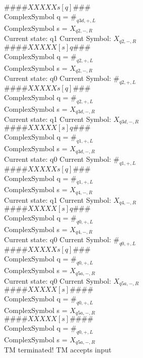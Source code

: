 \documentclass[10pt, a4paper]{article}
\begin{document}
$\# \#\# \# X X X X X s [ q ] \# \# \# $ \\
ComplexSymbol q = $\#_{q3d,+,L}$ \\
ComplexSymbol s = $X_{q2,-,R}$ \\ 
 \medskip
Current state: q1	 Current Symbol: 	 $X_{q2,-,R}$\\
$\# \#\# \# X X X X X [ s ] q \# \# \# $ \\
ComplexSymbol q = $\#_{q2,+,L}$ \\
ComplexSymbol s = $X_{q2,-,R}$ \\ 
 \medskip
Current state: q0	 Current Symbol: 	 $\#_{q2,+,L}$\\
$\# \#\# \# X X X X X s [ q ] \# \# \# $ \\
ComplexSymbol q = $\#_{q2,+,L}$ \\
ComplexSymbol s = $X_{q3d,-,R}$ \\ 
 \medskip
Current state: q1	 Current Symbol: 	 $X_{q3d,-,R}$\\
$\# \#\# \# X X X X X [ s ] q \# \# \# $ \\
ComplexSymbol q = $\#_{q1,+,L}$ \\
ComplexSymbol s = $X_{q3d,-,R}$ \\ 
 \medskip
Current state: q0	 Current Symbol: 	 $\#_{q1,+,L}$\\
$\# \#\# \# X X X X X s [ q ] \# \# \# $ \\
ComplexSymbol q = $\#_{q1,+,L}$ \\
ComplexSymbol s = $X_{q4,-,R}$ \\ 
 \medskip
Current state: q1	 Current Symbol: 	 $X_{q4,-,R}$\\
$\# \#\# \# X X X X X [ s ] q \# \# \# $ \\
ComplexSymbol q = $\#_{q0,+,L}$ \\
ComplexSymbol s = $X_{q4,-,R}$ \\ 
 \medskip
Current state: q0	 Current Symbol: 	 $\#_{q0,+,L}$\\
$\# \#\# \# X X X X X s [ q ] \# \# \# $ \\
ComplexSymbol q = $\#_{q0,+,L}$ \\
ComplexSymbol s = $X_{q5a,-,R}$ \\ 
 \medskip
Current state: q0	 Current Symbol: 	 $X_{q5a,-,R}$\\
$\# \#\# \# X X X X X [ s ] \# \# \# \# $ \\
ComplexSymbol q = $\#_{q0,+,L}$ \\
ComplexSymbol s = $X_{q5a,-,R}$ \\ 
 \medskip
$\# \#\# \# X X X X X [ s ] \# \# \# \# $ \\
ComplexSymbol q = $\#_{q0,+,L}$ \\
ComplexSymbol s = $X_{q5a,-,R}$ \\ 
 \medskip
TM terminated!	TM accepts input
\end{document}
